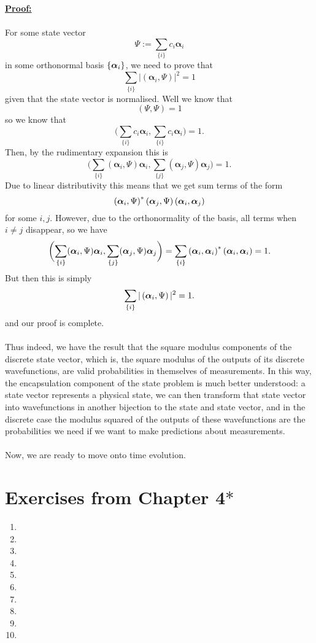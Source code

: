 \\\\
\textbf{\underline{Proof:}}
\\\\
For some state vector
$$
\Psi:=\sum_{\{i\}}c_{i}\bm{\alpha}_{i}
$$ 
in some orthonormal basis $\{\bm{\alpha}_{i}\}$, we need to prove that 
$$
\sum_{\{i\}}|(\bm{\alpha}_{i},\Psi)|^2=1
$$
given that the state vector is normalised. Well we know that 
$$
(\Psi,\Psi)=1
$$
so we know that 
$$
\biggl(\sum_{\{i\}}c_{i}\bm{\alpha}_{i},\sum_{\{i\}}c_{i}\bm{\alpha}_{i}\biggr)=1.
$$
Then, by the rudimentary expansion this is 
$$
\biggl(\sum_{\{i\}}(\bm{\alpha}_{i},\Psi)\bm{\alpha}_{i},\sum_{\{j\}}(\bm{\alpha}_{j},\Psi)\bm{\alpha}_{j}\biggr)=1.
$$
Due to linear distributivity this means that we get sum terms of the form
$$
\left(\bm{\alpha}_{i},\Psi\right)^{\ast}\left(\bm{\alpha}_{j},\Psi\right)\left(\bm{\alpha}_{i},\bm{\alpha}_{j}\right)
$$
for some $i,j$. However, due to the orthonormality of the basis, all terms when $i\neq j$ disappear, so we have 
$$
\biggl(\sum_{\{i\}}(\bm{\alpha}_{i},\Psi)\bm{\alpha}_{i},\sum_{\{j\}}(\bm{\alpha}_{j},\Psi)\bm{\alpha}_{j}\biggr)=\sum_{\{i\}}\left(\bm{\alpha}_{i},\bm{\alpha}_{i}\right)^{\ast}\left(\bm{\alpha}_{i},\bm{\alpha}_{i}\right)=1.
$$
But then this is simply
$$
\sum_{\{i\}}|\left(\bm{\alpha}_{i},\Psi\right)|^2=1.
$$
and our proof is complete.
\\\\
Thus indeed, we have the result that the square modulus components of the discrete state vector, which is, the square modulus of the outputs of its discrete wavefunctions, are valid probabilities in themselves of measurements. In this way, the encapsulation component of the state problem is much better understood: a state vector represents a physical state, we can then transform that state vector into wavefunctions in another bijection to the state and state vector, and in the discrete case the modulus squared of the outputs of these wavefunctions are the probabilities we need if we want to make predictions about measurements.
\\\\
Now, we are ready to move onto time evolution.
\section{Exercises from Chapter 4$\ast$}
\begin{enumerate}
    \item 
    \item
    \item
    \item
    \item
    \item
    \item
    \item
    \item
    \item
\end{enumerate}